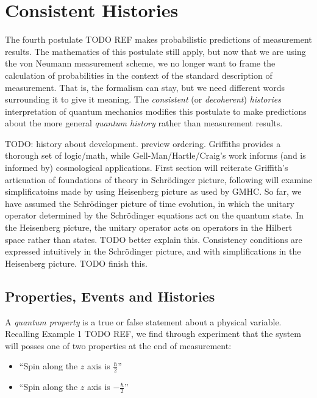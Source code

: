 \usetikzlibrary{shapes.geometric}
\usetikzlibrary{positioning}

\chapter{Consistent Histories}

The fourth postulate TODO REF makes probabilistic predictions of measurement results. The mathematics of this postulate still apply, but now that we are using the von Neumann measurement scheme, we no longer want to frame the calculation of probabilities in the context of the standard description of measurement. That is, the formalism can stay, but we need different words surrounding it to give it meaning. The \textit{consistent} (or \textit{decoherent}) \textit{histories} interpretation of quantum mechanics modifies this postulate to make predictions about the more general \textit{quantum history} rather than measurement results.

TODO: history about development. preview ordering. Griffiths provides a thorough set of logic/math, while Gell-Man/Hartle/Craig's work informs (and is informed by) cosmological applications. First section will reiterate Griffith's articuation of foundations of theory in Schrödinger picture, following will examine simplificatoins made by using Heisenberg picture as used by GMHC. So far, we have assumed the Schrödinger picture of time evolution, in which the unitary operator determined by the Schrödinger equations act on the quantum state. In the Heisenberg picture, the unitary operator acts on operators in the Hilbert space rather than states. TODO better explain this.
Consistency conditions are expressed intuitively in the Schrödinger picture, and with simplifications in the Heisenberg picture. TODO finish this.

\section{Properties, Events and Histories}

A \textit{quantum property} is a true or false statement about a physical variable. Recalling Example 1 TODO REF, we find through experiment that the system will posses one of two properties at the end of measurement:
\begin{itemize}
  \item ``Spin along the $z$ axis is $\frac{\hbar}{2}$''
  \item ``Spin along the $z$ axis is $-\frac{\hbar}{2}$''
\end{itemize}

